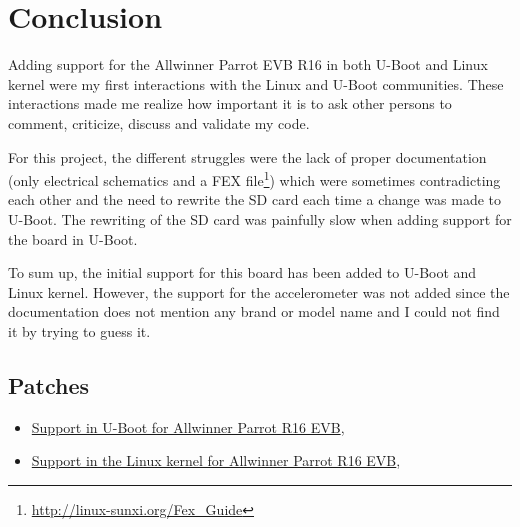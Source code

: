 \section{Conclusion}

Adding support for the Allwinner Parrot EVB R16 in both U-Boot and Linux kernel were my first interactions with the Linux and U-Boot communities. These interactions made me realize how important it is to ask other persons to comment, criticize, discuss and validate my code.

For this project, the different struggles were the lack of proper documentation (only electrical schematics and a FEX file\footnote{\url{http://linux-sunxi.org/Fex\_Guide}}) which were sometimes contradicting each other and the need to rewrite the SD card each time a change was made to U-Boot. The rewriting of the SD card was painfully slow when adding support for the board in U-Boot.

To sum up, the initial support for this board has been added to U-Boot and Linux kernel. However, the support for the accelerometer was not added since the documentation does not mention any brand or model name and I could not find it by trying to guess it.

\subsection*{Patches}

\begin{itemize}
  \item \href{http://lists.denx.de/pipermail/u-boot/2016-June/258992.html}{Support in U-Boot for Allwinner Parrot R16 EVB},
  \item \href{https://patchwork.kernel.org/patch/9197239/}{Support in the Linux kernel for Allwinner Parrot R16 EVB},
\end{itemize}
